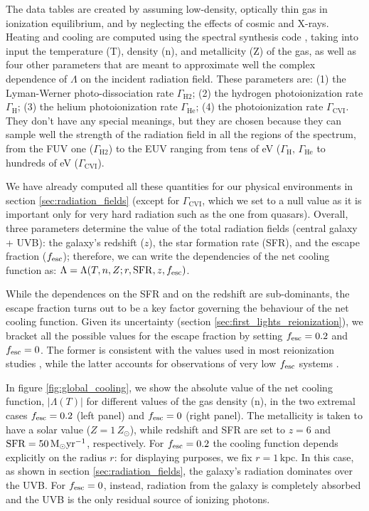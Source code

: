 The data tables are created by assuming low-density, optically thin gas in ionization equilibrium, and by neglecting the effects of cosmic and X-rays. Heating and cooling are computed using the  spectral synthesis code \citep{ferland1994}, taking into input the temperature (T), density (n), and metallicity (Z) of the gas, as well as four other parameters that are meant to approximate well the complex dependence of $\Lambda$ on the incident radiation field. These parameters are: (1) the Lyman-Werner \HH photo-dissociation rate $\Gamma_\mathrm{H2}$; (2) the hydrogen photoionization rate $\Gamma_\mathrm{H}$; (3) the helium photoionization rate $\Gamma_\mathrm{He}$; (4) the \CVIion photoionization rate $\Gamma_\mathrm{CVI}$. They don't have any special meanings, but they are chosen because they can sample well the strength of the radiation field in all the regions of the spectrum, from the FUV one ($\Gamma_\mathrm{H2}$) to the EUV ranging from tens of eV ($\Gamma_\mathrm{H},\,\Gamma_\mathrm{He}$ to hundreds of eV ($\Gamma_\mathrm{CVI}$). 

We have already computed all these quantities for our physical environments in section \ref{sec:radiation_fields} (except for $\Gamma_\mathrm{CVI}$, which we set to a null value as it is important only for very hard radiation such as the one from quasars). Overall, three parameters determine the value of the total radiation fields (central galaxy + UVB): the galaxy's redshift ($z$), the star formation rate (SFR), and the escape fraction ($f_{\rm esc}$); therefore, we can write the dependencies of the net cooling function as: $\Lambda = \Lambda(T,n,Z;r,\mathrm{SFR},z,f_{\rm esc})$. 

While the dependences on the SFR and on the redshift are sub-dominants, the escape fraction turns out to be a key factor governing the behaviour of the net cooling function. Given its uncertainty (section \ref{sec:first_lights_reionization}), we bracket all the possible values for the escape fraction by setting $f_{\rm esc} = 0.2$ and $f_{\rm esc} =0$. The former is consistent with the values used in most reionization studies \citep[e.g.,][]{Mitra15,Robertson15,Mitra18}, while the latter accounts for observations of very low $f_{\rm esc}$ systems \citep[e.g.,][]{inoue2006escape,paardekooper2015first, ma2020no}. 

In figure \ref{fig:global_cooling}, we show the absolute value of the net cooling function, $|\Lambda(T)|$ for different values of the gas density (n), in the two extremal cases $f_{\rm esc}=0.2$ (left panel) and $f_{\rm esc}=0$ (right panel). The metallicity is taken to have a solar value ($Z=1\,Z_\odot$), while redshift and SFR are set to $z=6$ and $\mathrm{SFR}=50\,{\rm M}_{\odot}\mathrm{yr}^{-1}$, respectively. For $f_{\rm esc}=0.2$ the cooling function depends explicitly on the radius $r$: for displaying purposes, we fix $r=1\,\mathrm{kpc}$. In this case, as shown in section \ref{sec:radiation_fields}, the galaxy's radiation dominates over the UVB. For $f_{\rm esc}=0$, instead, radiation from the galaxy is completely absorbed and the UVB is the only residual source of ionizing photons. 

